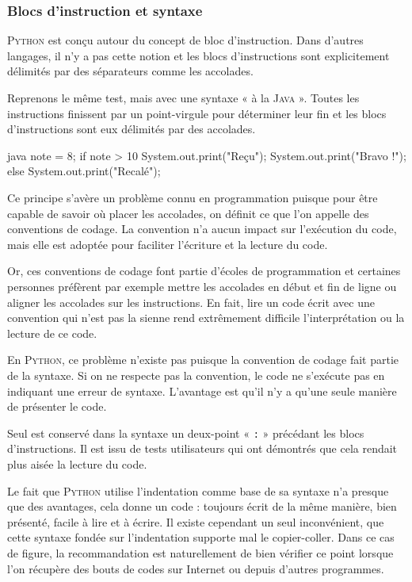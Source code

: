 \subsubsection[Blocs d'instruction et syntaxe]{Blocs d'instruction et syntaxe}
\label{subsub:XI.3.1.2}


\textsc{Python} est conçu autour du concept de bloc d'instruction. Dans d'autres langages, il n'y a pas cette notion et les blocs d’instructions sont explicitement délimités par des séparateurs comme les accolades.

Reprenons le même test, mais avec une syntaxe « à la \textsc{Java} ». Toutes les instructions finissent par un point-virgule pour déterminer leur fin et les blocs d'instructions sont eux délimités par des accolades. 

\begin{code*}{java}
note = 8;
if note > 10 {
  System.out.print("Reçu");
  System.out.print("Bravo !");
  }
else
  { System.out.print("Recalé"); }
\end{code*}

Ce principe s'avère un problème connu en programmation puisque pour être capable de savoir où placer les accolades, on définit ce que l'on appelle des conventions de codage. La convention n'a aucun impact sur l'exécution du code, mais elle est adoptée pour faciliter l'écriture et la lecture du code. 

Or, ces conventions de codage font partie d'écoles de programmation et certaines personnes préfèrent par exemple mettre les accolades en début et fin de ligne ou aligner les accolades sur les instructions. En fait, lire un code écrit avec une convention qui n'est pas la sienne rend extrêmement difficile l'interprétation ou la lecture de ce code.

En \textsc{Python}, ce problème n'existe pas puisque la convention de codage fait partie de la syntaxe. Si on ne respecte pas la convention, le code ne s'exécute pas en indiquant une erreur de syntaxe. L'avantage est qu'il n'y a qu'une seule manière de présenter le code.

Seul est conservé dans la syntaxe un deux-point « \texttt{:} » précédant les blocs d'instructions. Il est issu de tests utilisateurs qui ont démontrés que cela rendait plus aisée la lecture du code.

Le fait que \textsc{Python} utilise l'indentation comme base de sa syntaxe n'a presque que des avantages, cela donne un code : toujours écrit de la même manière, bien présenté, facile à lire et à écrire. Il existe cependant un seul inconvénient, que cette syntaxe fondée sur l'indentation supporte mal le copier-coller. Dans ce cas de figure, la recommandation est naturellement de bien vérifier ce point lorsque l'on récupère des bouts de codes sur Internet ou depuis d'autres programmes.

